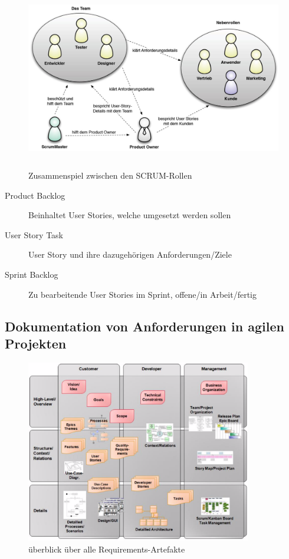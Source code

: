 \documentclass[a4paper]{article}
\begin{document}
	\begin{figure}[!htb]
		\centering
		\includegraphics[height=8cm]{img/re/05/scrum_roles.png}
		\caption{Zusammenspiel zwischen den SCRUM-Rollen}
		\label{fig:re_scrum_roles}
	\end{figure}

	\begin{description}
		\item[Product Backlog] Beinhaltet User Stories, welche umgesetzt werden sollen
		\item[User Story Task] User Story und ihre dazugehörigen Anforderungen/Ziele
		\item[Sprint Backlog] Zu bearbeitende User Stories im Sprint, offene/in Arbeit/fertig
	\end{description}

\newpage

		\subsection{Dokumentation von Anforderungen in agilen Projekten}
		
		\begin{figure}[!htb]
			\centering
			\includegraphics[height=8cm]{img/re/05/req_artifacts.png}
			\caption{überblick über alle Requirements-Artefakte}
			\label{fig:re_req_artifacts}
		\end{figure}
		
\end{document}
